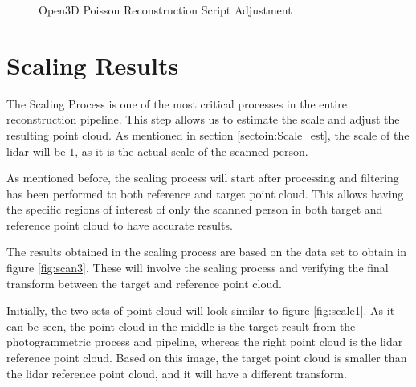 \documentclass[12pt]{report}
\begin{document}
\begin{figure}[H]
\caption{Open3D Poisson Reconstruction Script Adjustment}
\label{fig:open3dpossionscreipt_result} 
\end{figure}


\newpage
\section{Scaling Results}
\label{section:scale_res}

The Scaling Process is one of the most critical processes in the entire reconstruction pipeline. 
This step allows us to estimate the scale and adjust the resulting point cloud.
As mentioned in section \ref{sectoin:Scale_est}, the scale of the lidar will be  $1$, as it is the actual scale of the scanned person. 

As mentioned before, the scaling process will start after processing and filtering has been performed to both reference and target point cloud.
This allows having the specific regions of interest of only the scanned person in both target and reference point cloud to have accurate results.

The results obtained in the scaling process are based on the data set to obtain in figure \ref{fig:scan3}.
These will involve the scaling process and verifying the final transform between the target and reference point cloud. 

Initially,  the two sets of point cloud will look similar to figure \ref{fig:scale1}. 
As it can be seen, the point cloud in the middle is the target result from the photogrammetric process and pipeline, whereas the right point cloud is the lidar reference point cloud.
Based on this image, the target point cloud is smaller than the lidar reference point cloud, and it will have a different transform. 
\end{document}
